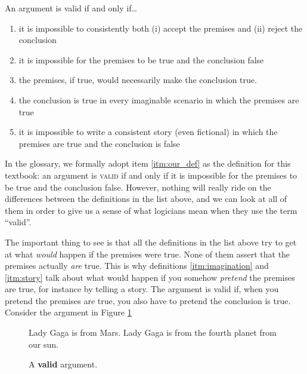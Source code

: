 An argument is valid if and only if\ldots 
\begin{enumerate}[label=(\alph*)]
\item it is impossible to consistently both (i) accept the premises and (ii) reject the conclusion

\item \label{itm:our_def} it is impossible for the premises to be true and the conclusion false

\item \label{itm:necessary} the premises, if true, would necessarily make the conclusion true.

\item \label{itm:imagination} the conclusion is true in every imaginable scenario in which the premises are true

\item \label{itm:story} it is impossible to write a consistent story (even fictional) in which the premises are true and the conclusion is false

\end{enumerate} 
 
In the glossary, we formally adopt item \ref{itm:our_def} as the definition for this textbook: an argument is \textsc{\gls{valid}} \label{def:valid} if and only if it is impossible for the premises to be true and the conclusion false.  However, nothing will really ride on the differences between the definitions in the list above, and we can look at all of them in order to give us a sense of what logicians mean when they use the term ``valid''.  
 
The important thing to see is that all the definitions in the list above try to get at what \textit{would} happen if the premises were true. None of them assert that the premises actually \textit{are} true. This is why definitions \ref{itm:imagination} and \ref{itm:story} talk about what would happen if you somehow \textit{pretend} the premises are true, for instance by telling a story. The argument is valid if, when you pretend the premises are true, you also have to pretend the conclusion is true. Consider the argument in Figure \ref{fig:Gaga_valid}


\begin{figure}
\begin{mdframed}[style=mytablebox]
\begin{earg*}
\item Lady Gaga is from Mars. 
\itemc[.4] Lady Gaga is from the fourth planet from our sun.
\end{earg*}
\end{mdframed}
\caption{A \textbf{valid} argument.} \label{fig:Gaga_valid}
\end{figure}

